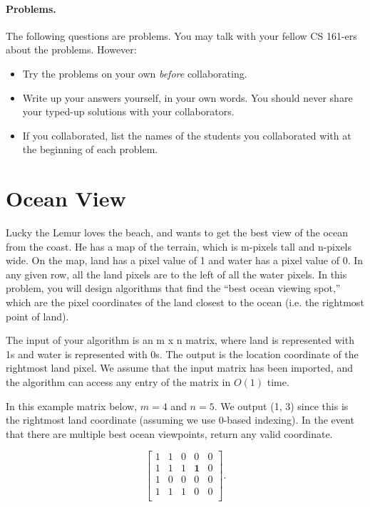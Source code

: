 \documentclass [12pt]{article}
\begin{document}
\newpage

\vspace {1em} \begin {Instruction} \paragraph {Problems.} The following questions are problems. You may talk with your fellow CS 161-ers about the problems. However: \begin {itemize} \item Try the problems on your own \emph {before} collaborating. \item Write up your answers yourself, in your own words. You should never share your typed-up solutions with your collaborators. \item If you collaborated, list the names of the students you collaborated with at the beginning of each problem. \end {itemize} \end {Instruction} 

\section {Ocean View} Lucky the Lemur loves the beach, and wants to get the best view of the ocean from the coast. He has a map of the terrain, which is m-pixels tall and n-pixels wide. On the map, land has a pixel value of 1 and water has a pixel value of 0. In any given row, all the land pixels are to the left of all the water pixels. In this problem, you will design algorithms that find the “best ocean viewing spot,” which are the pixel coordinates of the land closest to the ocean (i.e. the rightmost point of land). 

The input of your algorithm is an m x n matrix, where land is represented with 1s and water is represented with 0s. The output is the location coordinate of the rightmost land pixel. 
We assume that the input matrix has been imported, and the algorithm can access any entry of the matrix in $O(1)$ time.

In this example matrix below, $m=4$ and $n=5$. We output (1, 3) since this is the rightmost land coordinate (assuming we use 0-based indexing). In the event that there are multiple best ocean viewpoints, return any valid coordinate. 

$$\begin {bmatrix} 1 & 1 & 0 & 0 & 0 \\ 1 & 1 & 1 & \textbf {1} & 0 \\ 1 & 0 & 0 & 0 & 0 \\ 1 & 1 & 1 & 0 & 0 \\ \end {bmatrix}.$$ 
\end{document}
